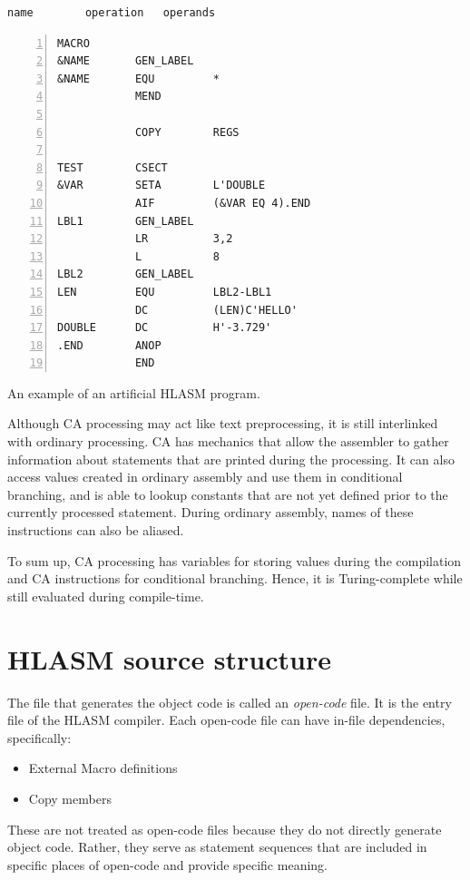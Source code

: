 \begin{listing}[t]
    \begin{verbatim}
name        operation   operands
    \end{verbatim}
	\begin{Verbatim}[numbers=left]
            MACRO                   
&NAME       GEN_LABEL
&NAME       EQU         *
            MEND
        
            COPY        REGS
        
TEST        CSECT
&VAR        SETA        L'DOUBLE
            AIF         (&VAR EQ 4).END
LBL1        GEN_LABEL
            LR          3,2
            L           8
LBL2        GEN_LABEL
LEN         EQU         LBL2-LBL1
            DC          (LEN)C'HELLO'
DOUBLE      DC          H'-3.729'
.END        ANOP
            END
	\end{Verbatim} 
	\caption{An example of an artificial HLASM program.}
	\label{lst:example}
\end{listing}

\vspace{5mm}

Although CA processing may act like text preprocessing, it is still interlinked with ordinary processing. CA has mechanics that allow the assembler to gather information about statements that are printed during the processing. It can also access values created in ordinary assembly and use them in conditional branching, and is able to lookup constants that are not yet defined prior to the currently processed statement. During ordinary assembly, names of these instructions can also be aliased.

To sum up, CA processing has variables for storing values during the compilation and CA instructions for conditional branching. Hence, it is Turing-complete while still evaluated during compile-time.

\section{HLASM source structure}

The file that generates the object code is called an \emph{open-code} file. It is the entry file of the HLASM compiler. Each open-code file can have in-file dependencies, specifically:
\begin{itemize}
	\item External Macro definitions
	\item Copy members
\end{itemize}
These are not treated as open-code files because they do not directly generate object code. Rather, they serve as statement sequences that are included in specific places of open-code and provide specific meaning.


